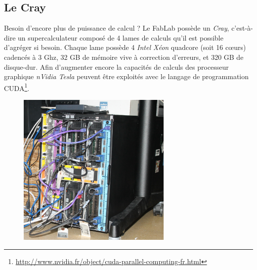 \subsection{Le Cray}
Besoin d'encore plus de puissance de calcul ? Le FabLab possède un \textit{Cray}, c'est-à-dire un supercalculateur composé de 4 lames de calculs qu'il est possible d'agréger si besoin. Chaque lame possède 4 \textit{Intel Xéon} quadcore (soit 16 c\oe urs) cadencés à 3 Ghz, 32 GB de mémoire vive à correction d'erreurs, et 320 GB de disque-dur. Afin d'augmenter encore la capacités de calculs des processeur graphique \textit{nVidia Tesla} peuvent être exploités avec le langage de programmation CUDA\footnote{\url{http://www.nvidia.fr/object/cuda-parallel-computing-fr.html}}.
\begin{figure}[h]
  \begin{center}
    \includegraphics[height=75mm]{Cray.jpg}
    \label{fig:cray}
  \end{center}
\end{figure}
